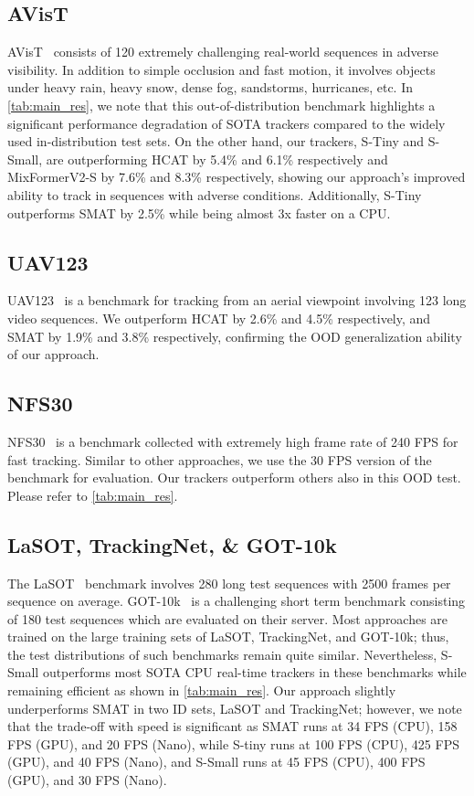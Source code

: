   
  \subsection{AVisT} 
  AVisT~\cite{noman2022avist} consists of 120 extremely challenging real-world sequences in adverse visibility.
  In addition to simple occlusion and fast motion, it involves objects under heavy rain, heavy snow, dense fog, sandstorms, hurricanes, etc. In \ref{tab:main_res}, we note that this out-of-distribution benchmark highlights a significant performance degradation of SOTA trackers compared to the widely used in-distribution test sets. On the other hand, our trackers, S-Tiny and S-Small, are outperforming HCAT by 5.4\% and 6.1\% respectively and MixFormerV2-S\cite{cui2024mixformerv2} by 7.6\% and 8.3\% respectively, showing our approach's improved ability to track in sequences with adverse conditions. Additionally, S-Tiny outperforms SMAT\cite{gopal2024separable} by 2.5\% while being almost 3x faster on a CPU.
  
  \subsection{UAV123}
  UAV123~\cite{mueller2016benchmark}  is a benchmark for tracking from an aerial viewpoint involving 123 long video sequences. We outperform HCAT by 2.6\% and 4.5\% respectively, and SMAT by 1.9\% and 3.8\% respectively, confirming the OOD generalization ability of our approach.


  \subsection{NFS30}
  NFS30~\cite{kiani2017need}  is a benchmark collected with extremely high frame rate of 240 FPS for fast tracking. Similar to other approaches, we use the 30 FPS version of the benchmark for evaluation. Our trackers outperform others also in this OOD test. Please refer to \ref{tab:main_res}.
  

  \subsection{LaSOT, TrackingNet, \& GOT-10k}
  The LaSOT~\cite{fan2021lasot} benchmark involves 280 long test sequences with 2500 frames per sequence on average.
  GOT-10k~\cite{Huang2021} is a challenging short term benchmark consisting of 180 test sequences which are evaluated on their server. Most approaches are trained on the large training sets of LaSOT, TrackingNet, and GOT-10k; thus, the test distributions of such benchmarks remain quite similar. 
  Nevertheless, S-Small outperforms most SOTA CPU real-time trackers in these benchmarks while remaining efficient as shown in \ref{tab:main_res}. Our approach slightly underperforms SMAT
  in two ID sets, LaSOT and TrackingNet; however, we note that the trade-off with speed is significant as SMAT runs at 34 FPS (CPU), 158 FPS (GPU), and 20 FPS (Nano), while S-tiny runs at 100 FPS (CPU), 425 FPS (GPU), and 40 FPS (Nano), and S-Small runs at 45 FPS (CPU), 400 FPS (GPU), and 30 FPS (Nano). 
  
